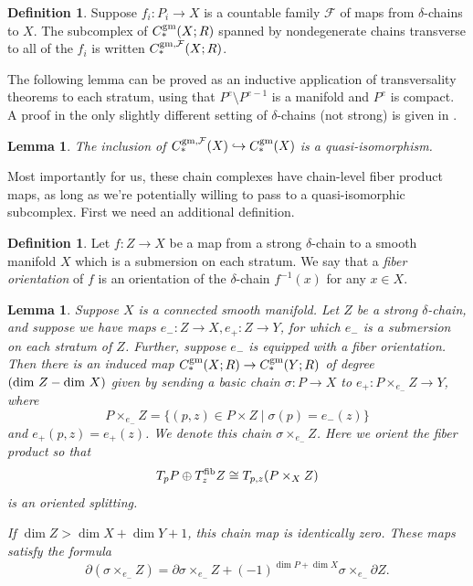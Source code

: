 \documentclass[10pt,a4paper]{amsart}
\newtheorem{lemma}[theorem]{Lemma}
\theoremstyle{definition}
\newtheorem{definition}[theorem]{Definition}
\theoremstyle{remark}
\numberwithin{figure}{qchap}
\begin{document}
\begin{definition}\label{trans-chains}Suppose $f_i: P_i \to X$ is a countable family $\mathcal F$ of maps from $\delta$-chains to $X$. The subcomplex of $C_*^{\textup{gm}}(X;R)$ spanned by nondegenerate chains transverse to all of the $f_i$ is written $C_*^{\textup{gm},\mathcal F}(X;R)$.
\end{definition}

The following lemma can be proved as an inductive application of transversality theorems to each stratum, using that $P^e \setminus P^{e-1}$ is a manifold and $P^e$ is compact. A proof in the only slightly different setting of $\delta$-chains (not strong) is given in \cite[Lemma~4.1.14]{Lin}. 

\begin{lemma}\label{qi-trans}The inclusion of $C_*^{\textup{gm},\mathcal F}(X) \hookrightarrow C_*^{\textup{gm}}(X)$ is a quasi-isomorphism.
\end{lemma}

Most importantly for us, these chain complexes have chain-level fiber product maps, as long as we're potentially willing to pass to a quasi-isomorphic subcomplex. First we need an additional definition.

\begin{definition}\label{FOrient}Let $f: Z \to X$ be a map from a strong $\delta$-chain to a smooth manifold $X$ which is a submersion on each stratum. We say that a \emph{fiber orientation} of $f$ is an orientation of the $\delta$-chain $f^{-1}(x)$ for any $x \in X$. 
\end{definition}

\begin{lemma}\label{fibprod}Suppose $X$ is a connected smooth manifold. Let $Z$ be a strong $\delta$-chain, and suppose we have maps $e_-: Z \to X, e_+: Z \to Y$, for which $e_-$ is a submersion on each stratum of $Z$. Further, suppose $e_-$ is equipped with a fiber orientation. Then there is an induced map $C^{\textup{gm}}_*(X;R) \to C^{\textup{gm}}_*(Y;R)$ of degree $(\textup{dim } Z - \textup{dim } X)$ given by sending a basic chain $\sigma: P \to X$ to $e_+: P \times_{e_-} Z\to Y$, where $$P \times_{e_-} Z = \{(p, z) \in P \times Z \mid \sigma(p) = e_-(z)\}$$ and $e_+(p,z) = e_+(z)$. We denote this chain $\sigma \times_{e_-} Z$. Here we orient the fiber product so that $$T_p P \oplus T^{\textup{fib}}_zZ \cong T_{p,z} (P \times_X Z)$$ is an oriented splitting.

If $\dim Z > \dim X + \dim Y + 1$, this chain map is identically zero. These maps satisfy the formula $$\partial(\sigma \times_{e_-} Z) =  \partial \sigma \times_{e_-} Z + (-1)^{\dim P + \dim X}\sigma \times_{e_-} \partial Z.$$
\end{lemma}
\end{document}
